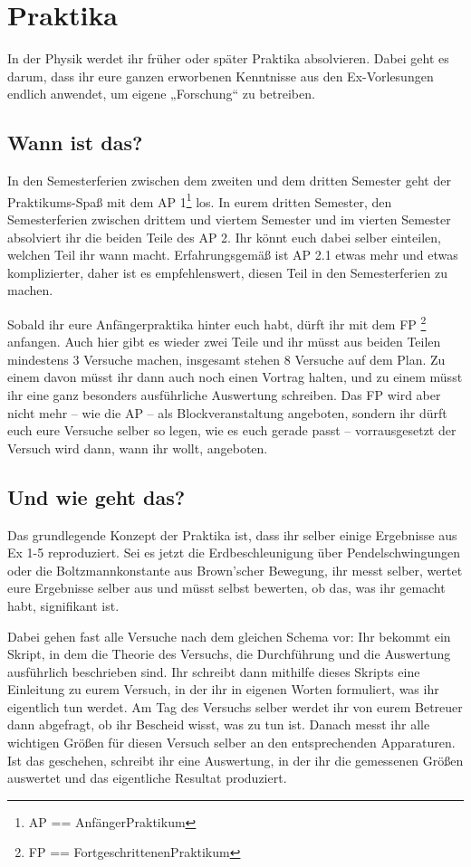 \section{Praktika}

In der Physik werdet ihr früher oder später Praktika absolvieren.
Dabei geht es darum, dass ihr eure ganzen erworbenen Kenntnisse aus den
Ex-Vorlesungen endlich anwendet, um eigene „Forschung“ zu betreiben.

\subsection{Wann ist das?}
In den Semesterferien zwischen dem zweiten und dem dritten Semester geht der
Praktikums-Spaß mit dem AP 1\footnote{AP == AnfängerPraktikum} los.
In eurem dritten Semester, den Semesterferien zwischen drittem und viertem
Semester und im vierten Semester absolviert ihr die beiden Teile des AP 2.
Ihr könnt euch dabei selber einteilen, welchen Teil ihr wann macht.
Erfahrungsgemäß ist AP 2.1 etwas mehr und etwas komplizierter, daher ist es
empfehlenswert, diesen Teil in den Semesterferien zu machen.

Sobald ihr eure Anfängerpraktika hinter euch habt, dürft ihr mit dem FP
\footnote{FP == FortgeschrittenenPraktikum} anfangen. Auch hier gibt es wieder
zwei Teile und ihr müsst aus beiden Teilen mindestens 3 Versuche machen,
insgesamt stehen 8 Versuche auf dem Plan. Zu einem davon müsst ihr dann auch
noch einen Vortrag halten, und zu einem müsst ihr eine ganz besonders
ausführliche Auswertung schreiben. Das FP wird aber nicht mehr -- wie die AP --
als Blockveranstaltung angeboten, sondern ihr dürft euch eure Versuche selber
so legen, wie es euch gerade passt -- vorrausgesetzt der Versuch wird dann, wann
ihr wollt, angeboten.

\subsection{Und wie geht das?}
Das grundlegende Konzept der Praktika ist, dass ihr selber einige Ergebnisse
aus Ex 1-5 reproduziert. Sei es jetzt die Erdbeschleunigung über
Pendelschwingungen oder die Boltzmannkonstante aus Brown'scher Bewegung, ihr
messt selber, wertet eure Ergebnisse selber aus und müsst selbst bewerten, ob
das, was ihr gemacht habt, signifikant ist.

Dabei gehen fast alle Versuche nach dem gleichen Schema vor:
Ihr bekommt ein Skript, in dem die Theorie des Versuchs, die Durchführung und
die Auswertung ausführlich beschrieben sind. Ihr schreibt dann mithilfe dieses
Skripts eine Einleitung zu eurem Versuch, in der ihr in eigenen Worten
formuliert, was ihr eigentlich tun werdet.
Am Tag des Versuchs selber werdet ihr von eurem Betreuer dann abgefragt, ob ihr
Bescheid wisst, was zu tun ist. Danach messt ihr alle wichtigen Größen für
diesen Versuch selber an den entsprechenden Apparaturen.
Ist das geschehen, schreibt ihr eine Auswertung, in der ihr die gemessenen
Größen auswertet und das eigentliche Resultat produziert.
